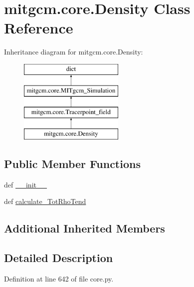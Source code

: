 \hypertarget{classmitgcm_1_1core_1_1Density}{\section{mitgcm.\+core.\+Density Class Reference}
\label{classmitgcm_1_1core_1_1Density}
}
Inheritance diagram for mitgcm.\+core.\+Density\+:\begin{figure}[H]
\begin{center}
\leavevmode
\includegraphics[height=4.000000cm]{classmitgcm_1_1core_1_1Density}
\end{center}
\end{figure}
\subsection*{Public Member Functions}
\begin{DoxyCompactItemize}
\item 
def \hyperlink{classmitgcm_1_1core_1_1Density_ac4f90f6a9c4a9fe9608b5bfdcb09a47c}{\+\_\+\+\_\+init\+\_\+\+\_\+}
\item 
def \hyperlink{classmitgcm_1_1core_1_1Density_aa8d1673db5cfbcd7fda25ad38a29b3a8}{calculate\+\_\+\+Tot\+Rho\+Tend}
\end{DoxyCompactItemize}
\subsection*{Additional Inherited Members}


\subsection{Detailed Description}


Definition at line 642 of file core.\+py.



